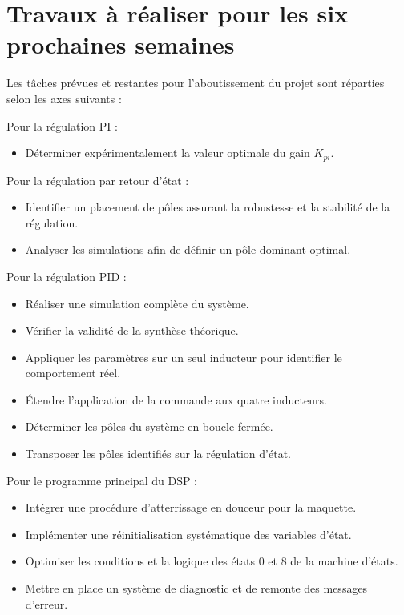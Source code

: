 \chapter{Travaux à réaliser pour les six prochaines semaines}

Les tâches prévues et restantes pour l'aboutissement du projet sont réparties selon les axes suivants :

Pour la régulation PI :
\begin{itemize}
    \item Déterminer expérimentalement la valeur optimale du gain $K_{pi}$.
\end{itemize}

Pour la régulation par retour d'état :
\begin{itemize}
    \item Identifier un placement de pôles assurant la robustesse et la stabilité de la régulation.
    \item Analyser les simulations afin de définir un pôle dominant optimal.
\end{itemize}

Pour la régulation PID :
\begin{itemize}
    \item Réaliser une simulation complète du système.
    \item Vérifier la validité de la synthèse théorique.
    \item Appliquer les paramètres sur un seul inducteur pour identifier le comportement réel.
    \item Étendre l'application de la commande aux quatre inducteurs.
    \item Déterminer les pôles du système en boucle fermée.
    \item Transposer les pôles identifiés sur la régulation d'état.
\end{itemize}

Pour le programme principal du DSP :
\begin{itemize}
    \item Intégrer une procédure d'atterrissage en douceur pour la maquette.
    \item Implémenter une réinitialisation systématique des variables d'état.
    \item Optimiser les conditions et la logique des états 0 et 8 de la machine d'états.
    \item Mettre en place un système de diagnostic et de remonte des messages d'erreur.
\end{itemize}

